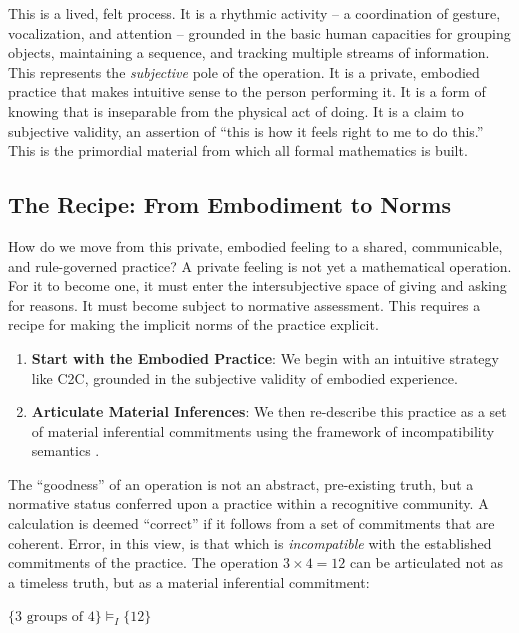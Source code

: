 \documentclass[12pt]{book}
\begin{document}
This is a lived, felt process. It is a rhythmic activity -- a coordination of gesture, vocalization, and attention -- grounded in the basic human capacities for grouping objects, maintaining a sequence, and tracking multiple streams of information. This represents the \textit{subjective} pole of the operation. It is a private, embodied practice that makes intuitive sense to the person performing it. It is a form of knowing that is inseparable from the physical act of doing. It is a claim to subjective validity, an assertion of ``this is how it feels right to me to do this.'' This is the primordial material from which all formal mathematics is built.

\subsection{The Recipe: From Embodiment to Norms}

How do we move from this private, embodied feeling to a shared, communicable, and rule-governed practice? A private feeling is not yet a mathematical operation. For it to become one, it must enter the intersubjective space of giving and asking for reasons. It must become subject to normative assessment. This requires a recipe for making the implicit norms of the practice explicit.

\begin{enumerate}
 \item \textbf{Start with the Embodied Practice}: We begin with an intuitive strategy like C2C, grounded in the subjective validity of embodied experience.
 
 \item \textbf{Articulate Material Inferences}: We then re-describe this practice as a set of material inferential commitments using the framework of incompatibility semantics \parencite{Brandom2008}.
\end{enumerate}

The ``goodness'' of an operation is not an abstract, pre-existing truth, but a normative status conferred upon a practice within a recognitive community. A calculation is deemed ``correct'' if it follows from a set of commitments that are coherent. Error, in this view, is that which is \textit{incompatible} with the established commitments of the practice. The operation $3 \times 4 = 12$ can be articulated not as a timeless truth, but as a material inferential commitment:

$\{ \text{3 groups of 4} \} \vDash_{I} \{ 12 \}$
\end{document}
